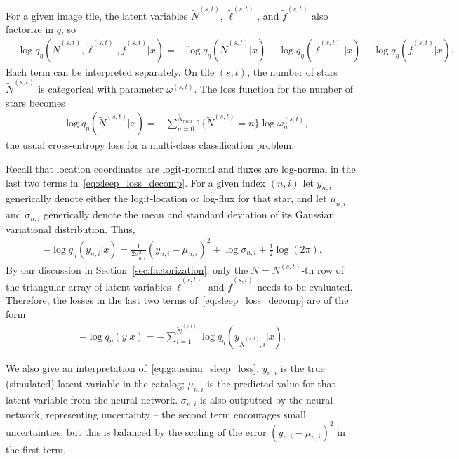 For a given image tile, the latent variables $\tilde N^{(s,t)}$, $\tilde \ell^{(s,t)}$, and $\tilde f^{(s,t)}$ also factorize in $q$, so 
\begin{align}
- \log q_\eta(\tilde N^{(s,t)}, 
                \tilde \ell^{(s,t)}, \tilde f^{(s,t)} | x) 
=   - \log q_\eta(\tilde N^{(s,t)} | x) 
        - \log q_\eta(\tilde \ell^{(s,t)} | x) 
        - \log q_\eta(\tilde f^{(s,t)} | x). 
        \label{eq:sleep_loss_decomp}
\end{align}
Each term can be interpreted separately. On tile $(s,t)$, the number of stars $\tilde N^{(s,t)}$ is categorical with parameter $\omega^{(s,t)}$. The loss function for the number of stars becomes
\begin{align}
    - \log q_\eta(\tilde N^{(s,t)} | x) = -\sum_{n = 0}^{\tilde N_{max}} 1\{\tilde N^{(s,t)} = n\} \log \omega^{(s,t)}_n, 
    \label{eq:cross_entropy_loss}
\end{align}
the usual cross-entropy loss for a multi-class classification problem. 

Recall that location coordinates are logit-normal and fluxes are log-normal in the last two terms in~\eqref{eq:sleep_loss_decomp}. 
For a given index $(n,i)$ let $y_{n,i}$ generically denote either the 
logit-location or log-flux for that star, 
and let $\mu_{n,i}$ and $\sigma_{n,i}$ generically denote the mean and standard deviation of its Gaussian variational distribution. Thus,
\begin{align}
    -\log q_\eta(y_{n,i} | x) = 
        \frac{1}{2\sigma^2_{n,i}}(y_{n,i} - \mu_{n,i})^2
         + \log\sigma_{n,i}
         + \frac{1}{2}\log(2\pi).
         \label{eq:gaussian_sleep_loss}
\end{align}
By our discussion in Section~\ref{sec:factorization}, 
only the $N = N^{(s,t)}$-th row of the triangular 
array of latent variables $\tilde \ell^{(s,t)}$ and $\tilde f^{(s,t)}$ needs to be evaluated. Therefore, the losses in the last two terms of~\eqref{eq:sleep_loss_decomp} are of the form 
\begin{align}
    -\log q_\eta(y | x) = -\sum_{i = 1}^{\tilde N^{(s,t)}} \log q_\eta(y_{\tilde N^{(s,t)},i} | x). 
\end{align}

We also give an interpretation of~\eqref{eq:gaussian_sleep_loss}: 
$y_{n,i}$ is the true (simulated) latent variable in the catalog; 
$\mu_{n,i}$ is the predicted value for that latent variable from the neural network. 
$\sigma_{n,i}$ is also outputted by the neural network, representing uncertainty -- the second term encourages small uncertainties, but this is 
balanced by the scaling of the error $(y_{n,i} - \mu_{n,i})^2$ in the first term. 

